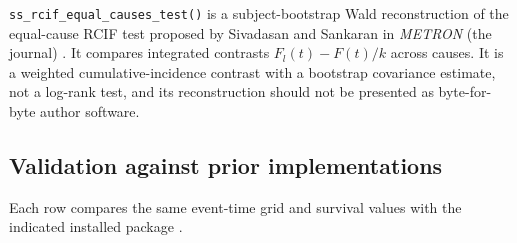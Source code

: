 \documentclass[
  12pt]{article}
\newenvironment{Shaded}{\begin{snugshade}}{\end{snugshade}}
\newcommand{\AttributeTok}[1]{\textcolor[rgb]{0.40,0.45,0.13}{#1}}
\newcommand{\DecValTok}[1]{\textcolor[rgb]{0.68,0.00,0.00}{#1}}
\newcommand{\FunctionTok}[1]{\textcolor[rgb]{0.28,0.35,0.67}{#1}}
\newcommand{\NormalTok}[1]{\textcolor[rgb]{0.00,0.23,0.31}{#1}}
\newcommand{\OtherTok}[1]{\textcolor[rgb]{0.00,0.23,0.31}{#1}}
\newcommand{\SpecialCharTok}[1]{\textcolor[rgb]{0.37,0.37,0.37}{#1}}
\newcommand{\StringTok}[1]{\textcolor[rgb]{0.13,0.47,0.30}{#1}}
\begin{document}
\texttt{ss\_rcif\_equal\_causes\_test()} is a subject-bootstrap Wald
reconstruction of the equal-cause RCIF test proposed by Sivadasan and
Sankaran in \emph{METRON} (the journal) \citep{sisuma2022}. It compares
integrated contrasts \(F_l(t)-F(t)/k\) across causes. It is a weighted
cumulative-incidence contrast with a bootstrap covariance estimate, not
a log-rank test, and its reconstruction should not be presented as
byte-for-byte author software.

\subsection{Validation against prior
implementations}\label{validation-against-prior-implementations}

Each row compares the same event-time grid and survival values with the
indicated installed package \citep{survrec, newtestsurvrec}.

\begin{Shaded}
\end{Shaded}
\end{document}
